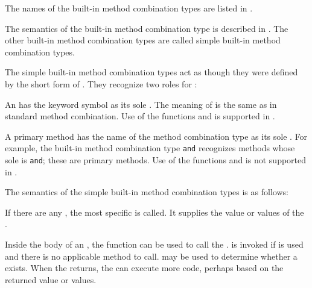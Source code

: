 The names of the built-in  method combination types are listed in \thenextfigure.
\idxref{+}%
%
%
%
%
%
%
%
%


The semantics of the  built-in method combination type is
described in \secref\StdMethComb.  The other
built-in method combination types are called simple built-in method
combination types.

The simple built-in method combination types act as though they were
defined by the short form of .  
They recognize two roles for :

\beginlist
                                                                  
\itemitem{\bull} An  has the keyword symbol 
 as its sole .  The meaning of 
  is the same as in standard method combination.
Use of the functions  and 
is supported in .

\itemitem{\bull} A primary method has the name of the method combination
type as its sole .  For example, the built-in method
combination type {\tt and} recognizes methods whose sole  is
{\tt and}; these are primary methods. Use of the functions 
 and  is not supported 
in .

\endlist

The semantics of the simple built-in method combination types is as
follows:

\beginlist
\itemitem{\bull}                                                    
If there are any , the most specific 
is called.   It supplies the value or values of the . 
                                    
\itemitem{\bull} Inside the body of an , the function
 can be used to call the .
 is invoked if 
 is used and there is no applicable method to call.
 may be used to determine whether a
 exists. When the  returns, 
the  can execute more code,
perhaps based on the returned value or values.
                    
